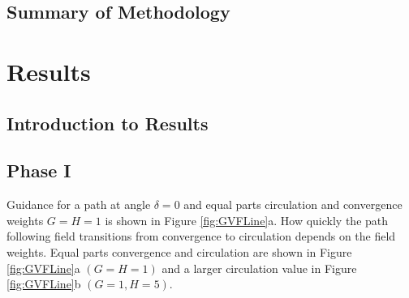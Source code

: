 \documentclass[numbered,pdftex]{ohio-etd}
\begin{document}
\section{Summary of Methodology}


\chapter{Results}
\section{Introduction to Results}
\section{Phase I}







Guidance for a path at angle $\delta = 0$ and equal parts circulation and convergence weights $G=H=1$ is shown in Figure \ref{fig:GVFLine}a. How quickly the path following field transitions from convergence to circulation depends on the field weights. Equal parts convergence and circulation are shown in Figure \ref{fig:GVFLine}a $(G=H=1)$ and a larger circulation value in Figure \ref{fig:GVFLine}b $(G=1, H=5)$. \\
\end{document}
